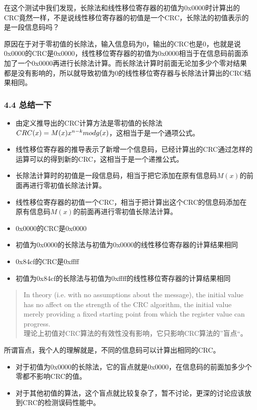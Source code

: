 \documentclass[
]{article}
\begin{document}
在这个测试中我们发现，长除法和线性移位寄存器的初值为0x0000时计算出的CRC竟然一样，不是说线性移位寄存器的初值是一个CRC，长除法的初值表示的是一段信息码吗？

原因在于对于零初值的长除法，输入信息码为0，输出的CRC也是0，也就是说0x0000的CRC是0x0000，线性移位寄存器的初值为0x0000相当于在信息码前面添加了一个0x0000再进行长除法计算。而长除法计算时前面无论加多少个零对结果都是没有影响的，所以就导致初值为0的线性移位寄存器与长除法计算出的CRC结果相同。

\hypertarget{header-n247}{%
\subsubsection{4.4 总结一下}\label{header-n247}}

\begin{itemize}
\item
  由定义推导出的CRC计算方法是零初值的长除法\(CRC(x)=M(x)x^{n-k} \space mod \space g(x)\)，这相当于是一个通项公式。
\item
  线性移位寄存器的推导表示了新增一个信息码，已经计算出的CRC通过怎样的运算可以的得到新的CRC，这相当于是一个递推公式。
\item
  长除法计算时的初值是一段信息码，相当于把它添加在原有信息码\(M(x)\)的前面再进行零初值长除法计算。
\item
  线性移位寄存器的初值一个CRC，相当于把计算出这个CRC的信息码添加在原有信息码\(M(x)\)的前面再进行零初值长除法计算。
\item
  0x0000的CRC是0x0000
\item
  初值为0x0000的长除法与初值为0x0000的线性移位寄存器的计算结果相同
\item
  0x84cf的CRC是0xffff
\item
  初值为0x84cf的长除法与初值为0xffff的线性移位寄存器的计算结果相同
\end{itemize}

\begin{quote}
In theory (i.e. with no assumptions about the message), the initial
value has no affect on the strength of the CRC algorithm, the initial
value merely providing a fixed starting point from which the register
value can progress. \\
理论上初值对CRC算法的有效性没有影响，它只影响CRC算法的''盲点``。
\end{quote}

所谓盲点，我个人的理解就是，不同的信息码可以计算出相同的CRC。

\begin{itemize}
\item
  对于初值为0x0000的长除法，它的盲点就是0x0000，在信息码的前面加多少个零都不影响CRC的值。
\item
  对于其他初值的算法，这个盲点就比较复杂了，暂不讨论，更深的讨论应该放到CRC的检测误码性能中。
\end{itemize}
\end{document}

